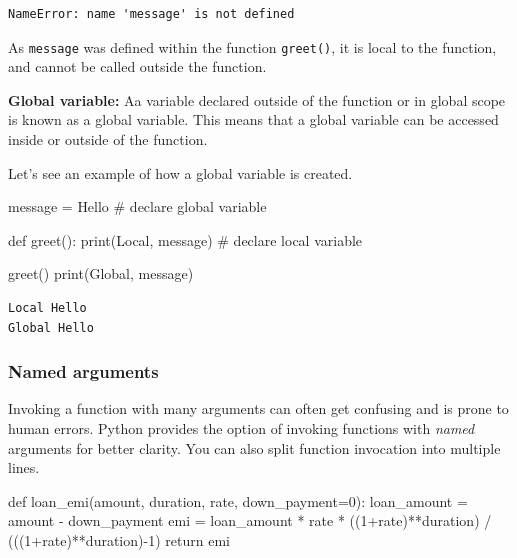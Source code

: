 \documentclass[
  letterpaper,
  DIV=11,
  numbers=noendperiod]{scrreprt}
\newenvironment{Shaded}{\begin{snugshade}}{\end{snugshade}}
\newcommand{\BuiltInTok}[1]{\textcolor[rgb]{0.00,0.23,0.31}{#1}}
\newcommand{\CommentTok}[1]{\textcolor[rgb]{0.37,0.37,0.37}{#1}}
\newcommand{\ControlFlowTok}[1]{\textcolor[rgb]{0.00,0.23,0.31}{#1}}
\newcommand{\DecValTok}[1]{\textcolor[rgb]{0.68,0.00,0.00}{#1}}
\newcommand{\KeywordTok}[1]{\textcolor[rgb]{0.00,0.23,0.31}{#1}}
\newcommand{\NormalTok}[1]{\textcolor[rgb]{0.00,0.23,0.31}{#1}}
\newcommand{\OperatorTok}[1]{\textcolor[rgb]{0.37,0.37,0.37}{#1}}
\newcommand{\StringTok}[1]{\textcolor[rgb]{0.13,0.47,0.30}{#1}}
\begin{document}
\begin{verbatim}
NameError: name 'message' is not defined
\end{verbatim}

As \texttt{message} was defined within the function \texttt{greet()}, it
is local to the function, and cannot be called outside the function.

\textbf{Global variable:} Aa variable declared outside of the function
or in global scope is known as a global variable. This means that a
global variable can be accessed inside or outside of the function.

Let's see an example of how a global variable is created.

\begin{Shaded}
\begin{Highlighting}[]
\NormalTok{message }\OperatorTok{=} \StringTok{\textquotesingle{}Hello\textquotesingle{}}  \CommentTok{\# declare global variable}

\KeywordTok{def}\NormalTok{ greet():}
    \BuiltInTok{print}\NormalTok{(}\StringTok{\textquotesingle{}Local\textquotesingle{}}\NormalTok{, message)  }\CommentTok{\# declare local variable}

\NormalTok{greet()}
\BuiltInTok{print}\NormalTok{(}\StringTok{\textquotesingle{}Global\textquotesingle{}}\NormalTok{, message)}
\end{Highlighting}
\end{Shaded}

\begin{verbatim}
Local Hello
Global Hello
\end{verbatim}

\hypertarget{named-arguments}{%
\subsubsection{Named arguments}\label{named-arguments}}

Invoking a function with many arguments can often get confusing and is
prone to human errors. Python provides the option of invoking functions
with \emph{named} arguments for better clarity. You can also split
function invocation into multiple lines.

\begin{Shaded}
\begin{Highlighting}[]
\KeywordTok{def}\NormalTok{ loan\_emi(amount, duration, rate, down\_payment}\OperatorTok{=}\DecValTok{0}\NormalTok{):}
\NormalTok{    loan\_amount }\OperatorTok{=}\NormalTok{ amount }\OperatorTok{{-}}\NormalTok{ down\_payment}
\NormalTok{    emi }\OperatorTok{=}\NormalTok{ loan\_amount }\OperatorTok{*}\NormalTok{ rate }\OperatorTok{*}\NormalTok{ ((}\DecValTok{1}\OperatorTok{+}\NormalTok{rate)}\OperatorTok{**}\NormalTok{duration) }\OperatorTok{/}\NormalTok{ (((}\DecValTok{1}\OperatorTok{+}\NormalTok{rate)}\OperatorTok{**}\NormalTok{duration)}\OperatorTok{{-}}\DecValTok{1}\NormalTok{)}
    \ControlFlowTok{return}\NormalTok{ emi}
\end{Highlighting}
\end{Shaded}
\end{document}
